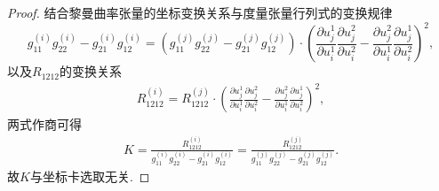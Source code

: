 \documentclass[../../main.tex]{subfiles}%
\begin{document}
\begin{proof}
结合黎曼曲率张量的坐标变换关系与度量张量行列式的变换规律
$$g_{11}^{(i)}g_{22}^{(i)}-g_{21}^{(i)}g_{12}^{(i)}=\left(g_{11}^{(j)}g_{22}^{(j)}-g_{21}^{(j)}g_{12}^{(j)}\right)\cdot\left(\frac{\partial u_j^1}{\partial u_i^1}\frac{\partial u_j^2}{\partial u_i^2}-\frac{\partial u_j^2}{\partial u_i^1}\frac{\partial u_j^1}{\partial u_i^2}\right)^2,$$
以及$R_{1212}$的变换关系
\begin{align}
R_{1212}^{(i)}=R_{1212}^{(j)}\cdot\left(\frac{\partial u_j^1}{\partial u_i^1}\frac{\partial u_j^2}{\partial u_i^2}-\frac{\partial u_j^2}{\partial u_i^1}\frac{\partial u_j^1}{\partial u_i^2}\right)^2,
\label{eq:mo23423efSGE9}
\end{align}
两式作商可得
\begin{align}
K=\frac{R_{1212}^{(i)}}{g_{11}^{(i)}g_{22}^{(i)}-g_{21}^{(i)}g_{12}^{(i)}}=\frac{R_{1212}^{(j)}}{g_{11}^{(j)}g_{22}^{(j)}-g_{21}^{(j)}g_{12}^{(j)}}.
\label{eq:mo23423efSGE10}
\end{align}
故$K$与坐标卡选取无关.
\end{proof}
\end{document}
